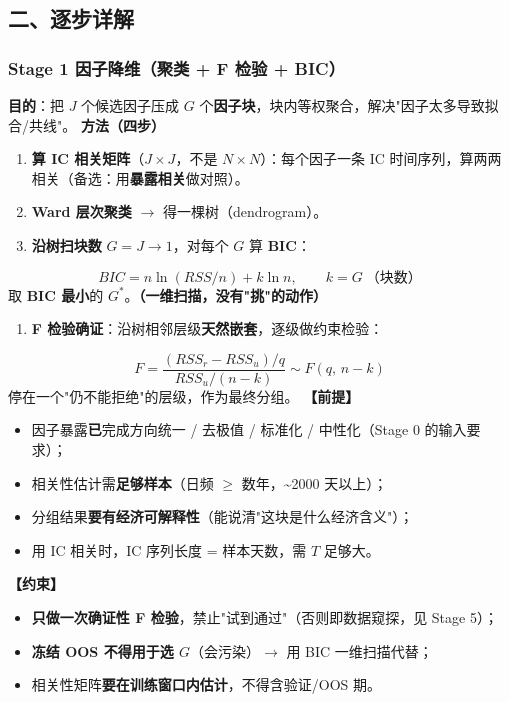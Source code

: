 \documentclass[11pt]{article}
\begin{document}
\subsection{\texorpdfstring{二、逐步详解}{二、逐步详解}}
\subsubsection{\texorpdfstring{Stage 1 \textperiodcentered{} 因子降维（聚类 + F 检验 + BIC）}{Stage 1 · 因子降维（聚类 + F 检验 + BIC）}}
\textbf{目的}：把 $J$ 个候选因子压成 $G$ 个\textbf{因子块}，块内等权聚合，解决"因子太多导致拟合/共线"。
\textbf{方法（四步）}
\begin{enumerate}
  \item \textbf{算 IC 相关矩阵}（$J\times J$，不是 $N\times N$）：每个因子一条 IC 时间序列，算两两相关（备选：用\textbf{暴露相关}做对照）。
  \item \textbf{Ward 层次聚类} \ensuremath{\rightarrow} 得一棵树（dendrogram）。
  \item \textbf{沿树扫块数} $G=J\to1$，对每个 $G$ 算 \textbf{BIC}：
\end{enumerate}
\[
BIC = n\ln(RSS/n) + k\ln n,\qquad k = G\ \text{（块数）}
\]
取 \textbf{BIC 最小}的 $G^{*}$。\textbf{（一维扫描，没有"挑"的动作）}
\begin{enumerate}
  \item \textbf{F 检验确证}：沿树相邻层级\textbf{天然嵌套}，逐级做约束检验：
\end{enumerate}
\[
F=\frac{(RSS_r-RSS_u)/q}{RSS_u/(n-k)}\sim F(q,\,n-k)
\]
停在一个"仍不能拒绝"的层级，作为最终分组。
\textbf{【前提】}
\begin{itemize}
  \item 因子暴露\textbf{已}完成方向统一 / 去极值 / 标准化 / 中性化（Stage 0 的输入要求）；
  \item 相关性估计需\textbf{足够样本}（日频 \ensuremath{\ge} 数年，\textasciitilde{}2000 天以上）；
  \item 分组结果\textbf{要有经济可解释性}（能说清"这块是什么经济含义"）；
  \item 用 IC 相关时，IC 序列长度 = 样本天数，需 $T$ 足够大。
\end{itemize}
\textbf{【约束】}
\begin{itemize}
  \item \textbf{只做一次确证性 F 检验}，禁止"试到通过"（否则即数据窥探，见 Stage 5）；
  \item \textbf{冻结 OOS 不得用于选 $G$}（会污染）\ensuremath{\rightarrow} 用 BIC 一维扫描代替；
  \item 相关性矩阵\textbf{要在训练窗口内估计}，不得含验证/OOS 期。
\end{itemize}
\end{document}
